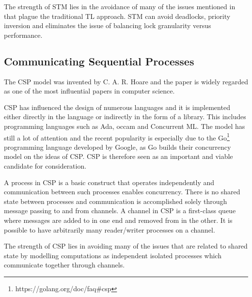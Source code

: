 The strength of \ac{STM} lies in the avoidance of many of the issues mentioned in  that plague the traditional \ac{TL} approach. \ac{STM} can avoid deadlocks, priority inversion and eliminates the issue of balancing lock granularity versus performance\cite[p. 1]{harris2005composable}.

\subsection{Communicating Sequential Processes}
The \ac{CSP} model was invented by C. A. R. Hoare\cite{hoare1978communicating} and the paper is widely regarded as one of the most influential papers in computer science\cite{abdallah2005communicating}. 

\ac{CSP} has influenced the design of numerous languages and it is implemented either directly in the language or indirectly in the form of a library. This includes programming languages such as Ada, occam and Concurrent ML\cite{abdallah2005communicating}. The model has still a lot of attention and the recent popularity is especially due to the Go\footnote{https://golang.org/doc/faq\#csp} programming language developed by Google, as Go builds their concurrency model on the ideas of \ac{CSP}\cite[Chap. 6]{sevenModels}. \ac{CSP} is therefore seen as an important and viable candidate for consideration.

A process in \ac{CSP} is a basic construct that operates independently and communication between such processes enables concurrency\cite{ibmCSP}. There is no shared state between processes and communication is accomplished solely through message passing to and from channels. A channel in \ac{CSP} is a first-class queue where messages are added to in one end and removed from in the other\cite[Chap. 6]{sevenModels}. It is possible to have arbitrarily many reader/writer processes on a channel. 

The strength of \ac{CSP} lies in avoiding many of the issues that are related to shared state by modelling computations as independent isolated processes which communicate together through channels. 

